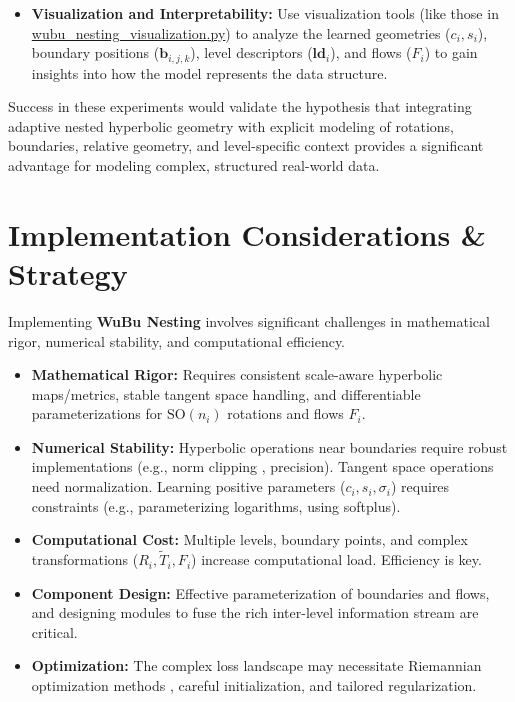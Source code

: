 \documentclass[11pt, twoside]{article} %
\newcommand{\SO}[1]{\text{SO}(#1)} %
\newcommand{\wubu}{\textbf{WuBu Nesting}} %
\begin{document}
\begin{itemize}
    \item \textbf{Visualization and Interpretability:} Use visualization tools (like those in \url{wubu_nesting_visualization.py}) to analyze the learned geometries ($c_i, s_i$), boundary positions ($\mathbf{b}_{i,j,k}$), level descriptors ($\mathbf{ld}_i$), and flows ($F_i$) to gain insights into how the model represents the data structure.
\end{itemize}

Success in these experiments would validate the hypothesis that integrating adaptive nested hyperbolic geometry with explicit modeling of rotations, boundaries, relative geometry, and level-specific context provides a significant advantage for modeling complex, structured real-world data.

\section{Implementation Considerations \& Strategy}
\label{sec:implementation}

Implementing \wubu{} involves significant challenges in mathematical rigor, numerical stability, and computational efficiency.

\begin{itemize}[leftmargin=*, labelsep=5pt]
    \item \textbf{Mathematical Rigor:} Requires consistent scale-aware hyperbolic maps/metrics, stable tangent space handling, and differentiable parameterizations for $\SO{n_i}$ rotations \cite{MhammediEtAl2017} and flows $F_i$.
    \item \textbf{Numerical Stability:} Hyperbolic operations near boundaries require robust implementations (e.g., norm clipping \cite{LiuHeHan2025}, precision). Tangent space operations need normalization. Learning positive parameters ($c_i, s_i, \sigma_i$) requires constraints (e.g., parameterizing logarithms, using softplus).
    \item \textbf{Computational Cost:} Multiple levels, boundary points, and complex transformations ($R_i, \tilde{T}_i, F_i$) increase computational load. Efficiency is key.
    \item \textbf{Component Design:} Effective parameterization of boundaries and flows, and designing modules to fuse the rich inter-level information stream are critical.
    \item \textbf{Optimization:} The complex loss landscape may necessitate Riemannian optimization methods \cite{BecigneulGanea2019, KochurovEtAl2020}, careful initialization, and tailored regularization.
\end{itemize}
\end{document}
